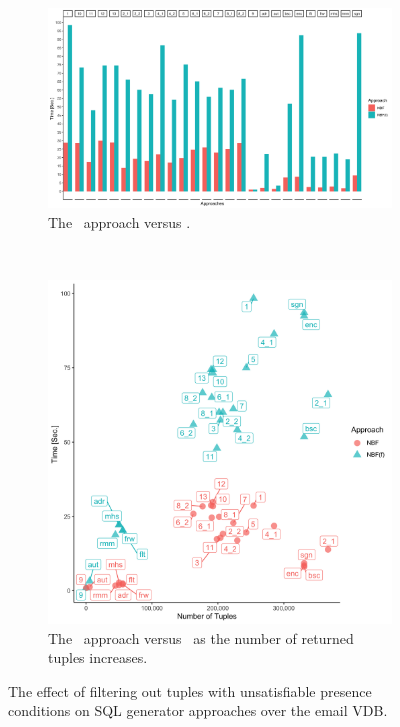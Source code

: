 \begin{figure}[t!]
\begin{subfigure}[t]{0.5\textwidth}
        \label{fig:enron-nbfi-tuple}
    \end{subfigure}\\[1ex]
     \begin{subfigure}[t]{0.5\textwidth}
        \centering
        \includegraphics[width=\textwidth]{figs/plots/enron-nbf-comp-f.png}
        \caption[The \nbf\ approach versus \nbff]{The \nbf\ approach versus \nbff.}
    \end{subfigure}%
    ~ 
    \begin{subfigure}[t]{0.5\textwidth}
        \centering
        \includegraphics[scale=0.09]{figs/plots/enron-nbf-f-comp-scatter.png}
        \caption[The \nbf\ approach versus \nbff\ as the number of returned tuples increases]{The \nbf\ approach versus \nbff\ as the number of returned tuples increases.}
        \label{fig:enron-nbf-tuple}
    \end{subfigure}
    \caption[The effect of filtering out tuples with unsatisfiable presence conditions on SQL generator 
    approaches over the email VDB]{The effect of filtering out tuples with unsatisfiable presence conditions on SQL generator 
    approaches over the email VDB.}
    \label{fig:enron-nbfs-filter}
\end{figure}

